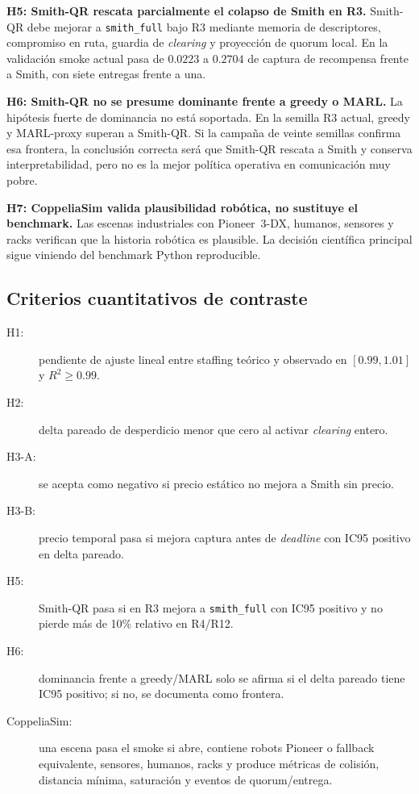 \textbf{H5: Smith-QR rescata parcialmente el colapso de Smith en R3.}
Smith-QR debe mejorar a \texttt{smith\_full} bajo R3 mediante memoria de descriptores,
compromiso en ruta, guardia de \emph{clearing} y proyección de quorum local. En la
validación smoke actual pasa de $0.0223$ a $0.2704$ de captura de recompensa frente a
Smith, con siete entregas frente a una.

\textbf{H6: Smith-QR no se presume dominante frente a greedy o MARL.}
La hipótesis fuerte de dominancia no está soportada. En la semilla R3 actual, greedy y
MARL-proxy superan a Smith-QR. Si la campaña de veinte semillas confirma esa frontera,
la conclusión correcta será que Smith-QR rescata a Smith y conserva interpretabilidad,
pero no es la mejor política operativa en comunicación muy pobre.

\textbf{H7: CoppeliaSim valida plausibilidad robótica, no sustituye el benchmark.}
Las escenas industriales con Pioneer~3-DX, humanos, sensores y racks verifican que la
historia robótica es plausible. La decisión científica principal sigue viniendo del
benchmark Python reproducible.

\subsection{Criterios cuantitativos de contraste}
\label{subsec:criterios}

\begin{description}
  \item[H1:] pendiente de ajuste lineal entre staffing teórico y observado en
  $[0.99,1.01]$ y $R^2\geq0.99$.
  \item[H2:] delta pareado de desperdicio menor que cero al activar
  \emph{clearing} entero.
  \item[H3-A:] se acepta como negativo si precio estático no mejora a Smith sin precio.
  \item[H3-B:] precio temporal pasa si mejora captura antes de \emph{deadline} con
  IC95 positivo en delta pareado.
  \item[H5:] Smith-QR pasa si en R3 mejora a \texttt{smith\_full} con IC95 positivo y no
  pierde más de 10\% relativo en R4/R12.
  \item[H6:] dominancia frente a greedy/MARL solo se afirma si el delta pareado tiene
  IC95 positivo; si no, se documenta como frontera.
  \item[CoppeliaSim:] una escena pasa el smoke si abre, contiene robots Pioneer o
  fallback equivalente, sensores, humanos, racks y produce métricas de colisión,
  distancia mínima, saturación y eventos de quorum/entrega.
\end{description}
